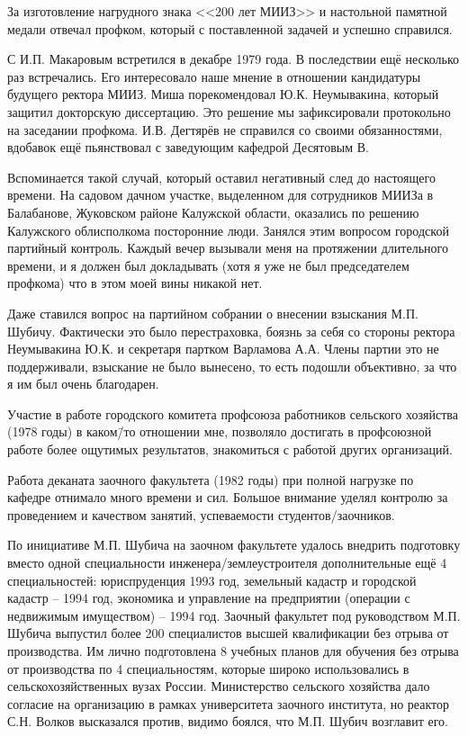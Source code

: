 За изготовление нагрудного знака <<200 лет МИИЗ>> и настольной памятной медали отвечал профком, который с поставленной задачей и успешно справился.

С И.П. Макаровым встретился в декабре 1979 года. В последствии ещё несколько раз встречались. Его интересовало наше мнение в отношении кандидатуры будущего ректора МИИЗ. Миша порекомендовал Ю.К. Неумывакина, который защитил докторскую диссертацию. Это решение мы зафиксировали протокольно на заседании профкома. И.В. Дегтярёв не справился со своими обязанностями, вдобавок ещё пьянствовал с заведующим кафедрой Десятовым В.

Вспоминается такой случай, который оставил негативный след до настоящего времени. На садовом дачном участке, выделенном для сотрудников МИИЗа в Балабанове, Жуковском районе Калужской области, оказались по решению Калужского облисполкома посторонние люди. Занялся этим вопросом городской партийный контроль. Каждый вечер вызывали меня на протяжении длительного времени, и я должен был докладывать (хотя я уже не был председателем профкома) что в этом моей вины никакой нет.

Даже ставился вопрос на партийном собрании о внесении взыскания М.П. Шубичу. Фактически это было перестраховка, боязнь за себя со стороны ректора Неумывакина Ю.К. и секретаря партком Варламова А.А. Члены партии это не поддерживали, взыскание не было вынесено, то есть подошли объективно, за что я им был очень благодарен.

Участие в работе городского комитета профсоюза работников сельского хозяйства (1978 годы) в каком\=/то отношении мне, позволяло достигать в профсоюзной работе более ощутимых результатов, знакомиться с работой других организаций.

Работа деканата заочного факультета (1982 годы) при полной нагрузке по кафедре отнимало много времени и сил. Большое внимание уделял контролю за проведением и качеством занятий, успеваемости студентов\-/заочников.

По инициативе М.П. Шубича на заочном факультете удалось внедрить подготовку вместо одной специальности инженера\-/землеустроителя дополнительные ещё 4 специальностей: юриспруденция 1993 год, земельный кадастр и городской кадастр \--- 1994 год, экономика и управление на предприятии (операции с недвижимым имуществом) \--- 1994 год. Заочный факультет под руководством М.П. Шубича выпустил более 200 специалистов высшей квалификации без отрыва от производства. Им лично подготовлена 8 учебных планов для обучения без отрыва от производства по 4 специальностям, которые широко использовались в сельскохозяйственных вузах России. Министерство сельского хозяйства дало согласие на организацию в рамках университета заочного института, но реактор С.Н. Волков высказался против, видимо боялся, что М.П. Шубич возглавит его.

